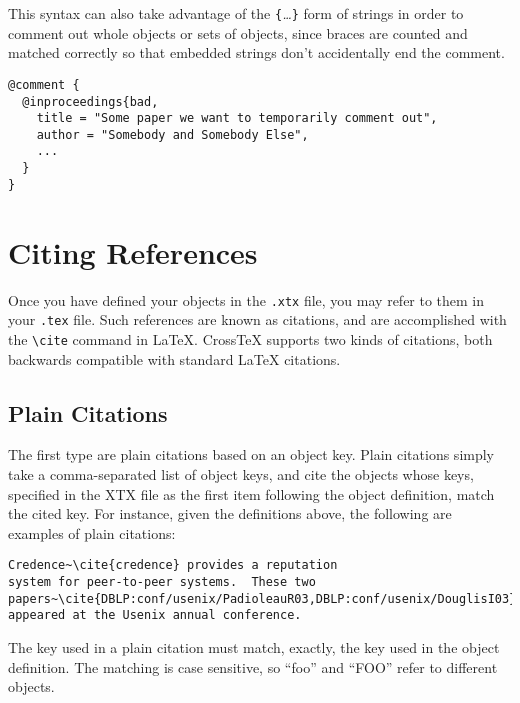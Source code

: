 \documentclass{article}
\newcommand{\XTX}{Cross\TeX}
\begin{document}
This syntax can also take advantage of the
\verb"{"\textit{\ldots}\verb"}" form of strings in order to comment
out whole objects or sets of objects, since braces are counted and matched
correctly so that embedded strings don't accidentally end the comment.

\begin{small}\begin{verbatim}
@comment {
  @inproceedings{bad,
    title = "Some paper we want to temporarily comment out",
    author = "Somebody and Somebody Else",
    ...
  }
}
\end{verbatim}\end{small}

\section{Citing References\label{sec:citing}}

Once you have defined your objects in the \texttt{.xtx} file, you may
refer to them in your \texttt{.tex} file. Such references are known as
citations, and are accomplished with the \verb"\cite" command in \LaTeX{}.
\XTX{} supports two kinds of citations, both backwards compatible with
standard \LaTeX{} citations.

\subsection{Plain Citations}

The first type are plain citations based on an object key. Plain citations
simply take a comma-separated list of object keys, and cite the objects
whose keys, specified in the XTX file as the first item following
the object definition, match the cited key. For instance, given the
definitions above, the following are examples of plain citations:

\begin{small}\begin{verbatim}
Credence~\cite{credence} provides a reputation
system for peer-to-peer systems.  These two
papers~\cite{DBLP:conf/usenix/PadioleauR03,DBLP:conf/usenix/DouglisI03}
appeared at the Usenix annual conference.
\end{verbatim}\end{small}

The key used in a plain citation must match, exactly, the key used in
the object definition. The matching is case sensitive, so ``foo'' and
``FOO'' refer to different objects.
\end{document}

